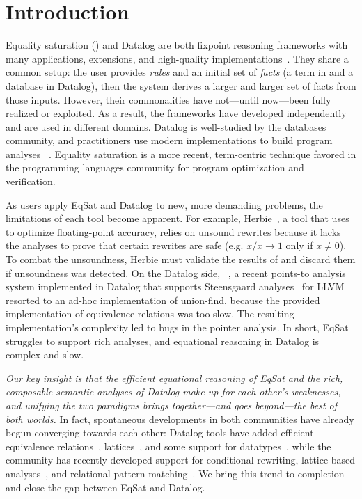 \section{Introduction}


Equality saturation (\eqsat) and Datalog are both
 fixpoint reasoning frameworks with 
 many 
 applications,
 extensions,
 and high-quality implementations~\cite{egg, souffle}.
They share a common setup: 
 the user provides \emph{rules} and an initial set of \emph{facts} 
   (a term in \eqsat and a database in Datalog),
 then the system derives a larger and larger set of facts from those inputs.
However,
 their commonalities have not---until now---been fully realized or exploited.
As a result, 
 the frameworks have developed independently and are used in different domains.
Datalog is well-studied by the databases community, 
 and practitioners use modern implementations
 to build program analyses%
 ~\cite{cclyzer,cclyzerpp,doop-datalog}.
Equality saturation
 is a more recent, term-centric technique
 favored in the programming languages community
 for program optimization and verification.

As users apply EqSat and Datalog to new, 
  more demanding problems,
  the limitations of each tool
  become apparent.
For example,
 Herbie~\cite{herbie}, 
 a tool that uses \eqsat to optimize floating-point accuracy, 
 relies on unsound rewrites because it lacks the analyses
 to prove that certain rewrites are safe 
 (e.g. $x/x \rightarrow 1$ only if $x \neq 0$).
To combat the unsoundness,
 Herbie must validate the results of \eqsat
 and discard them if unsoundness was detected.
On the Datalog side,
 \cclyzerpp~\cite{cclyzerpp},
 a recent points-to analysis system implemented in Datalog
 that supports Steensgaard analyses~\citep{DBLP:conf/popl/Steensgaard96}
 for LLVM~\citep{llvm}
 resorted to an ad-hoc implementation of union-find,
 because the provided implementation of equivalence relations
 was too slow.
The resulting implementation's complexity led to bugs
 in the pointer analysis.
In short, EqSat struggles to support rich analyses, 
  and equational reasoning in Datalog is complex and slow.

\emph{Our key insight is that
 the efficient equational reasoning of EqSat and 
 the rich, composable semantic analyses of Datalog 
  make up for each other's weaknesses, 
  and unifying the two paradigms brings 
  together---and goes beyond---the best of both worlds.}
In fact, spontaneous developments in both communities 
  have already begun converging towards each other:
Datalog tools have 
  added efficient equivalence relations~\cite{eqrel},
  lattices~\cite{flix,ascent},
  and some support for datatypes~\cite{souffle-adt}, 
  while the \eqsat community
  has recently developed support for
  conditional rewriting,
  lattice-based analyses~\cite{egg,metatheory.jl},
  and relational pattern matching~\cite{relational-ematching}.
We bring this trend to completion and close the gap
  between EqSat and Datalog.

